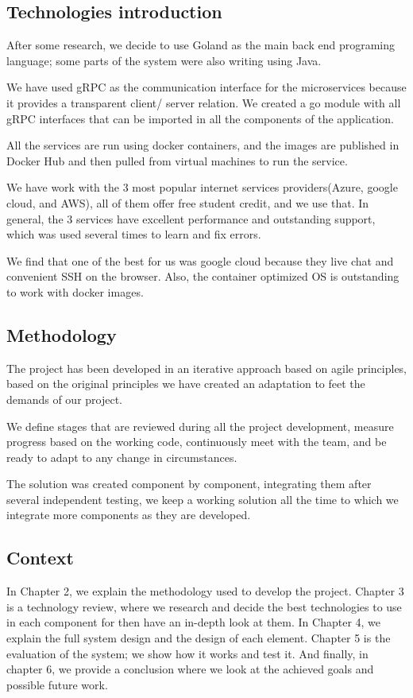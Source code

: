 \subsection{Technologies introduction}
\vskip 0.1in
\indent
\indent
After some research, we decide to use Goland as the main back end programing language; some parts of the system were also writing using Java. 

We have used gRPC as the communication interface for the microservices because it provides a transparent client/ server relation. We created a go module with all gRPC interfaces that can be imported in all the components of the application.

All the services are run using docker containers, and the images are published in Docker Hub and then pulled from virtual machines to run the service. 

We have work with the 3 most popular internet services providers(Azure, google cloud, and AWS), all of them offer free student credit, and we use that. In general, the 3 services have excellent performance and outstanding support, which was used several times to learn and fix errors.

We find that one of the best for us was google cloud because they live chat and convenient SSH on the browser.  Also, the container optimized OS is outstanding to work with docker images. 


\subsection{Methodology}
\vskip 0.1in
\indent
\indent
The project has been developed in an iterative approach based on agile principles, based on the original principles we have created an adaptation to feet the demands of our project.

We define stages that are reviewed during all the project development, measure progress based on the working code, continuously meet with the team, and be ready to adapt to any change in circumstances.

The solution was created component by component, integrating them after several independent testing, we keep a working solution all the time to which we integrate more components as they are developed.

\subsection{Context}
\vskip 0.1in
\indent
\indent
In Chapter 2, we explain the methodology used to develop the project. Chapter 3 is a technology review, where we research and decide the best technologies to use in each component for then have an in-depth look at them. In Chapter 4, we explain the full system design and the design of each element. Chapter 5 is the evaluation of the system; we show how it works and test it. And finally, in chapter 6, we provide a conclusion where we look at the achieved goals and possible future work.


